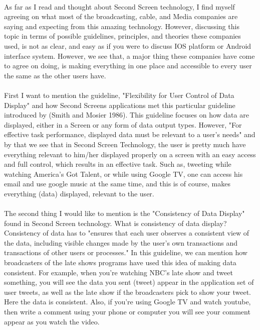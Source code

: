 \documentclass[12pt, oneside]{article}   	%
\begin{document}
    \paragraph{}
  As far as I read and thought about Second Screen technology, I find myself agreeing on what most of the broadcasting, cable, and Media companies are saying and expecting from this amazing technology.  However, discussing this topic in terms of possible guidelines, principles, and theories these companies used, is not as clear, and easy as if you were to discuss IOS platform or Android interface system.  However, we see that, a major thing these companies have come to agree on doing, is making everything in one place and accessible to every user the same as the other users have.
 \paragraph{}
 First I want to mention the guideline, "Flexibility for User Control of Data Display" and how Second Screens applications met this particular guideline introduced by (Smith and Mosier 1986).  This guideline focuses on how data are displayed, either in a Screen or any form of data output types.  However, "For effective task performance, displayed data must be relevant to a user's needs"\cite{Guideline} and by that we see that in Second Screen Technology, the user is pretty much have everything relevant to him/her displayed properly on a screen with an easy access and full control, which results in an effective task.  Such as, tweeting while watching America's Got Talent, or while using Google TV, one can access his email and use google music at the same time, and this is of course, makes everything (data) displayed, relevant to the user. 
  \paragraph{}
 The second thing I would like to mention is the "Consistency of Data Display" found in Second Screen technology.  What is consistency of data display?   Consistency of data has to "ensures that each user observes a consistent view of the data, including visible changes made by the user's own transactions and transactions of other users or processes."\cite{guidline2} In this guideline, we can mention how broadcasters of the late shows programs have used this idea of making data consistent.  For example, when you're watching NBC's late show and tweet something, you will see the data you sent (tweet) appear in the application set of user tweets, as well as the late show if the broadcasters pick to show your tweet.  Here the data is consistent.  Also, if you're using Google TV and watch youtube, then write a comment using your phone or computer you will see your comment appear as you watch the video.
\end{document}
